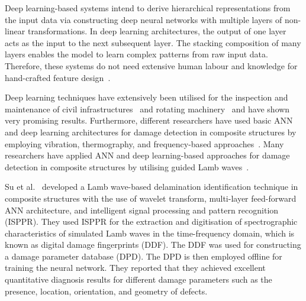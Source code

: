 \begin{sloppypar}
	Deep learning-based systems intend to derive hierarchical representations from the input data via constructing deep neural networks with multiple layers of non-linear transformations.
	In deep learning architectures, the output of one layer acts as the input to the next subsequent layer.
	The stacking composition of many layers enables the model to learn complex patterns from raw input data.
	Therefore, these systems do not need extensive human labour and knowledge for hand-crafted feature design~\cite{Zhao2019b}. %
	
	Deep learning techniques have extensively been utilised for the inspection 
	and maintenance of civil infrastructures~\cite{cha2017deep, Lin2017a, 
	Liu2019, wang2020research} and rotating 
	machinery~\cite{janssens2016convolutional, Jia2016a} and have shown very 
	promising results.
	Furthermore, different researchers have used basic ANN and deep learning architectures for damage detection in composite structures by employing vibration, thermography, and frequency-based approaches~\cite{chakraborty2005artificial, Khan2019a, luo2019temporal, bang2020defect}. 
	Many researchers have applied ANN and deep learning-based approaches for damage detection in composite structures by utilising guided Lamb waves~\cite{Su2004a, chetwynd2008damage, de2015application, feng2019locating, mardanshahi2020detection, qian2020application, Tabian2019, rautela2021ultrasonic}.
	
	Su et al.~\cite{Su2004a} developed a Lamb wave-based delamination identification technique in composite structures with the use of wavelet transform, multi-layer feed-forward ANN architecture, and intelligent signal processing and pattern recognition (ISPPR).
	They used ISPPR for the extraction and digitisation of spectrographic characteristics of simulated Lamb waves in the time-frequency domain, which is known as digital damage fingerprints (DDF).
	The DDF was used for constructing a damage parameter database (DPD). 
	The DPD is then employed offline for training the neural network.
	They reported that they achieved excellent quantitative diagnosis results for different damage parameters such as the presence, location, orientation, and geometry of defects.
	

\end{sloppypar}
